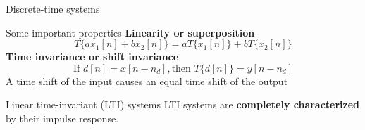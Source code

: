 \documentclass[10pt, aspectratio=169]{beamer}
\begin{document}
%
\begin{frame}{Discrete-time systems}

\begin{figure}
	\centering
	\resizebox{0.8\linewidth}{!}{}
	\label{fig:DTsystem}
\end{figure}

\begin{block}{Some important properties}
	\textbf{Linearity or superposition}
	\begin{equation*}
	T\{ax_1[n] + bx_2[n]\} = aT\{x_1[n]\} + bT\{x_2[n]\}
	\end{equation*}
	\textbf{Time invariance or shift invariance}
	\begin{equation*}
	\text{If } d[n] = x[n-n_d], \text{then } T\{d[n]\} = y[n-n_d]
	\end{equation*}
	A time shift of the input causes an equal time shift of the output
\end{block}
\end{frame}

%
\begin{frame}[t]{Linear time-invariant (LTI) systems}
LTI systems are \textbf{completely characterized} by their impulse response.

\begin{figure}
	\centering
	\vspace{-0.25cm}
	\resizebox{0.7\linewidth}{!}{}
	\label{fig:DTimp}
\end{figure}
\vspace{-0.5cm}

\end{frame}
\end{document}
